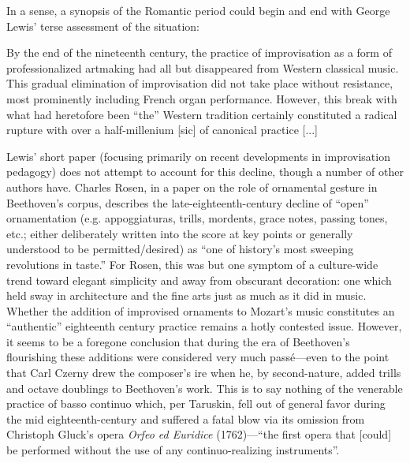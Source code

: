     In a sense, a synopsis of the Romantic period could begin and end with George Lewis' terse assessment of the situation:

    \begin{smallquote}
        By the end of the nineteenth century, the practice of improvisation as a form of professionalized artmaking had all but disappeared from Western classical music. This gradual elimination of improvisation did not take place without resistance, most prominently including French organ performance. However, this break with what had heretofore been ``the'' Western tradition certainly constituted a radical rupture with over a half-millenium [sic] of canonical practice [...]\autocite{Lewis_2007}
    \end{smallquote}

    Lewis' short paper (focusing primarily on recent developments in improvisation pedagogy) does not attempt to account for this decline, though a number of other authors have. Charles Rosen, in a paper on the role of ornamental gesture in Beethoven's corpus, describes the late-eighteenth-century decline of ``open'' ornamentation (e.g. appoggiaturas, trills, mordents, grace notes, passing tones, etc.; either deliberately written into the score at key points or generally understood to be permitted/desired) as ``one of history's most sweeping revolutions in taste.'' For Rosen, this was but one symptom of a culture-wide trend toward elegant simplicity and away from obscurant decoration: one which held sway in architecture and the fine arts just as much as it did in music. Whether the addition of improvised ornaments to Mozart's music constitutes an ``authentic'' eighteenth century practice remains a hotly contested issue. However, it seems to be a foregone conclusion that during the era of Beethoven's flourishing these additions were considered very much passé---even to the point that Carl Czerny drew the composer's ire when he, by second-nature, added trills and octave doublings to Beethoven's work.\autocite[1198--9]{Rosen_1970} This is to say nothing of the venerable practice of basso continuo which, per Taruskin, fell out of general favor during the mid eighteenth-century\autocite[428]{Taruskin_2009a} and suffered a fatal blow via its omission from Christoph Gluck's opera \textit{Orfeo ed Euridice} (1762)---``the first opera that [could] be performed without the use of any continuo-realizing instruments''.\autocite[457]{Taruskin_2009b}

